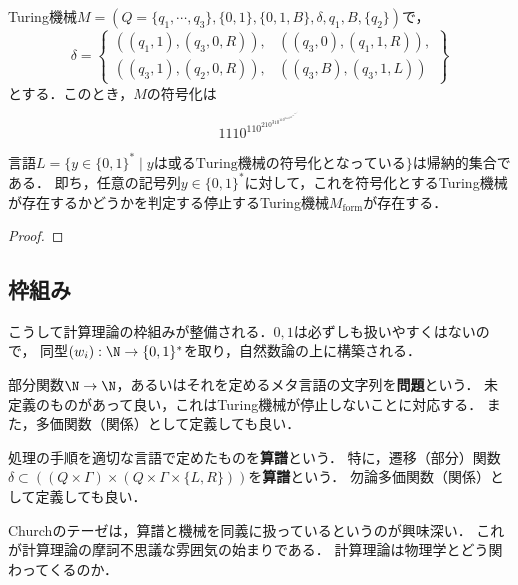 \begin{example}
    Turing機械$M=(Q=\{q_1,\cdots,q_3\},\{0,1\},\{0,1,B\},\delta,q_1,B,\{q_2\})$で，
    \[\delta=\left\{\begin{array}{ll}
        ((q_1,1),(q_3,0,R)),&((q_3,0),(q_1,1,R)),\\
        ((q_3,1),(q_2,0,R)),&((q_3,B),(q_3,1,L))
    \end{array}\right\}\]
    とする．このとき，$M$の符号化は
    \[1110^110^210^310^110^2110^310^110^110^210^2110^310^210^210^110^2110^310^310^310^210^1111\]
\end{example}

\begin{proposition}\label{prop-encoding-of-Turing-machine-is-computable}
    言語$L=\{y\in\{0,1\}^*\mid yは或る\mathrm{Turing}機械の符号化となっている\}$は帰納的集合である．
    即ち，任意の記号列$y\in\{0,1\}^*$に対して，これを符号化とするTuring機械が存在するかどうかを判定する停止するTuring機械$M_{\mathrm{form}}$が存在する．
\end{proposition}
\begin{proof}
    
\end{proof}

\subsection{枠組み}

\begin{tcolorbox}[colframe=ForestGreen, colback=ForestGreen!10!white, breakable]
    こうして計算理論の枠組みが整備される．$0,1$は必ずしも扱いやすくはないので，
    同型$(w_i):\N\to\{0,1\}^*$を取り，自然数論の上に構築される．
\end{tcolorbox}

\begin{definition}[problem]
    部分関数$\N\to\N$，あるいはそれを定めるメタ言語の文字列を\textbf{問題}という．
    未定義のものがあって良い，これはTuring機械が停止しないことに対応する．
    また，多価関数（関係）として定義しても良い．
\end{definition}

\begin{definition}[algorithm]\label{def-algorithm}
    処理の手順を適切な言語で定めたものを\textbf{算譜}という．
    特に，遷移（部分）関数$\delta\subset((Q\times\Gamma)\times(Q\times\Gamma\times\{L,R\}))$を\textbf{算譜}という．
    勿論多価関数（関係）として定義しても良い．
\end{definition}
\begin{remark}
    Churchのテーゼは，算譜と機械を同義に扱っているというのが興味深い．
    これが計算理論の摩訶不思議な雰囲気の始まりである．
    計算理論は物理学とどう関わってくるのか．
\end{remark}

